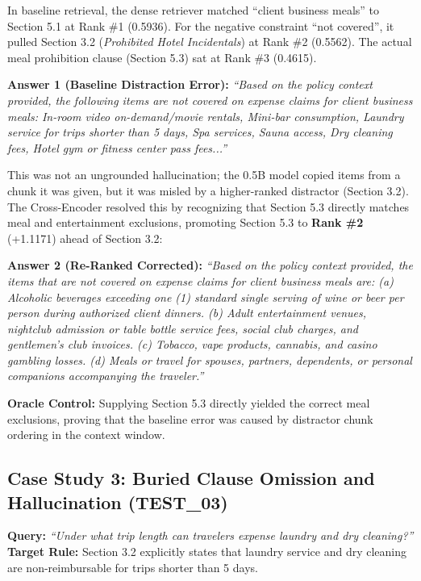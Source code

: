 \documentclass[11pt,a4paper]{article}
\newenvironment{answerquote}{%
  \begin{list}{}{%
    \setlength{\leftmargin}{1.0em}%
    \setlength{\rightmargin}{1.0em}%
    \setlength{\topsep}{2pt}%
    \setlength{\partopsep}{0pt}%
    \setlength{\parsep}{0pt}%
    \setlength{\itemsep}{0pt}%
  }%
  \item\small\itshape
}{%
  \end{list}%
}
\begin{document}
In baseline retrieval, the dense retriever matched ``client business meals'' to Section 5.1 at Rank \#1 (0.5936). For the negative constraint ``not covered'', it pulled Section 3.2 (\textit{Prohibited Hotel Incidentals}) at Rank \#2 (0.5562). The actual meal prohibition clause (Section 5.3) sat at Rank \#3 (0.4615).
\begin{answerquote}
\textbf{Answer 1 (Baseline Distraction Error):} \textit{``Based on the policy context provided, the following items are not covered on expense claims for client business meals: In-room video on-demand/movie rentals, Mini-bar consumption, Laundry service for trips shorter than 5 days, Spa services, Sauna access, Dry cleaning fees, Hotel gym or fitness center pass fees...''}
\end{answerquote}
This was not an ungrounded hallucination; the 0.5B model copied items from a chunk it was given, but it was misled by a higher-ranked distractor (Section 3.2). The Cross-Encoder resolved this by recognizing that Section 5.3 directly matches meal and entertainment exclusions, promoting Section 5.3 to \textbf{Rank \#2} (+1.1171) ahead of Section 3.2:
\begin{answerquote}
\textbf{Answer 2 (Re-Ranked Corrected):} \textit{``Based on the policy context provided, the items that are not covered on expense claims for client business meals are: (a) Alcoholic beverages exceeding one (1) standard single serving of wine or beer per person during authorized client dinners. (b) Adult entertainment venues, nightclub admission or table bottle service fees, social club charges, and gentlemen's club invoices. (c) Tobacco, vape products, cannabis, and casino gambling losses. (d) Meals or travel for spouses, partners, dependents, or personal companions accompanying the traveler.''}
\end{answerquote}
\textbf{Oracle Control:} Supplying Section 5.3 directly yielded the correct meal exclusions, proving that the baseline error was caused by distractor chunk ordering in the context window.

\subsection{Case Study 3: Buried Clause Omission and Hallucination (TEST\_03)}
\textbf{Query:} \textit{``Under what trip length can travelers expense laundry and dry cleaning?''}\\
\textbf{Target Rule:} Section 3.2 explicitly states that laundry service and dry cleaning are non-reimbursable for trips shorter than 5 days.
\end{document}
